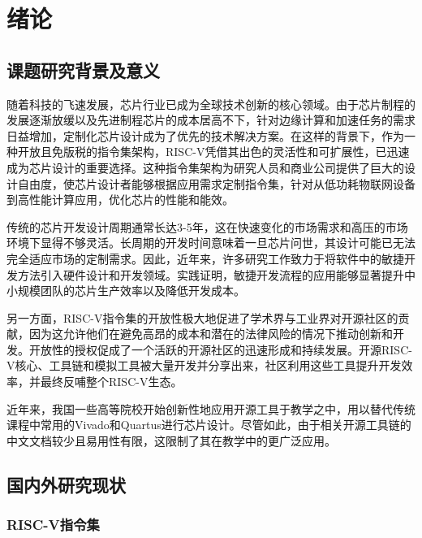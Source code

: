 
\chapter{绪论}

\section{课题研究背景及意义}

随着科技的飞速发展，芯片行业已成为全球技术创新的核心领域。由于芯片制程的发展逐渐放缓以及先进制程芯片的成本居高不下，针对边缘计算和加速任务的需求日益增加，定制化芯片设计成为了优先的技术解决方案。在这样的背景下，作为一种开放且免版税的指令集架构，RISC-V凭借其出色的灵活性和可扩展性，已迅速成为芯片设计的重要选择。这种指令集架构为研究人员和商业公司提供了巨大的设计自由度，使芯片设计者能够根据应用需求定制指令集，针对从低功耗物联网设备到高性能计算应用，优化芯片的性能和能效。

传统的芯片开发设计周期通常长达3-5年，这在快速变化的市场需求和高压的市场环境下显得不够灵活。长周期的开发时间意味着一旦芯片问世，其设计可能已无法完全适应市场的定制需求。因此，近年来，许多研究工作致力于将软件中的敏捷开发方法引入硬件设计和开发领域\cite{bachrachChiselConstructingHardware2012,xuDevelopingHighPerformance2022}。实践证明，敏捷开发流程的应用能够显著提升中小规模团队的芯片生产效率以及降低开发成本。

另一方面，RISC-V指令集的开放性极大地促进了学术界与工业界对开源社区的贡献，因为这允许他们在避免高昂的成本和潜在的法律风险的情况下推动创新和开发。开放性的授权促成了一个活跃的开源社区的迅速形成和持续发展。开源RISC-V核心、工具链和模拟工具被大量开发并分享出来，社区利用这些工具提升开发效率，并最终反哺整个RISC-V生态。

近年来，我国一些高等院校开始创新性地应用开源工具于教学之中\cite{YuanJiSuanJiXiTongDaoLunKeChengJiaoXueSiLuJiKeChengZiYuanJianShe2023}，用以替代传统课程中常用的Vivado和Quartus进行芯片设计。尽管如此，由于相关开源工具链的中文文档较少且易用性有限，这限制了其在教学中的更广泛应用。

\section{国内外研究现状}

\subsection{RISC-V指令集}

